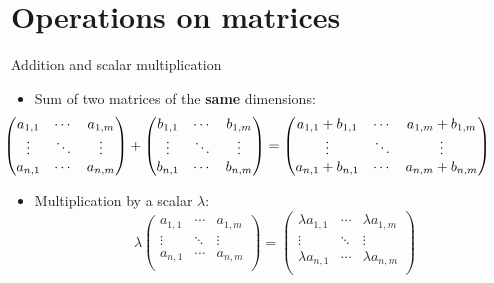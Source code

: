 \documentclass{beamer}
\begin{document}
\section{Operations on matrices}

\begin{frame}[t]{Addition and scalar multiplication}
	\grid

	\vspace{0.3cm}
	\begin{itemize}
		\item
			Sum of two matrices of the \textbf{same} dimensions:
			{\small
				$$
				\!\!\!\!\!\!\!\!\!\!\!\!
				\hspace*{-0.7cm}
				\begin{pmatrix}
					a_{1,1}  & \cdots & a_{1,m} \\
					\vdots & \ddots & \vdots \\
					a_{n,1} & \cdots & a_{n,m} \\
				\end{pmatrix}
				+
				\begin{pmatrix}
					b_{1,1}  & \cdots & b_{1,m} \\
					\vdots & \ddots & \vdots \\
					b_{n,1} & \cdots & b_{n,m} \\
				\end{pmatrix}
				=
				\begin{pmatrix}
					a_{1,1} + b_{1,1}  & \cdots & a_{1,m} + b_{1,m} \\
					\vdots & \ddots & \vdots \\
					a_{n,1} + b_{n,1} & \cdots & a_{n,m} + b_{n,m} \\
				\end{pmatrix}
				$$
			}
			\vspace{0.6cm}

		\item
			{
				Multiplication by a scalar $\lambda$:
				$$
				\lambda
				\begin{pmatrix}
					a_{1,1}  & \cdots & a_{1,m} \\
					\vdots & \ddots & \vdots \\
					a_{n,1} & \cdots & a_{n,m} \\
				\end{pmatrix}
				=
				\begin{pmatrix}
					\lambda a_{1,1}  & \cdots & \lambda a_{1,m} \\
					\vdots & \ddots & \vdots \\
					\lambda a_{n,1} & \cdots & \lambda a_{n,m} \\
				\end{pmatrix}
				$$
			}
	\end{itemize}
\end{frame}
\end{document}
